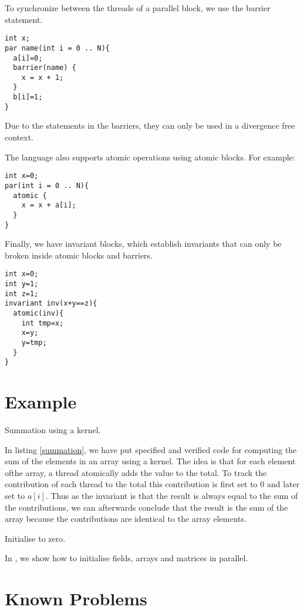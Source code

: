 To synchronize between the threads of a parallel block, we use the barrier statement.
\begin{lstlisting}
int x;
par name(int i = 0 .. N){
  a[i]=0;
  barrier(name) {
    x = x + 1;
  }
  b[i]=1;
}
\end{lstlisting}
Due to the statements in the barriers, they can only be used in
a divergence free context.

The language also supports atomic operations using atomic blocks.
For example:
\begin{lstlisting}
int x=0;
par(int i = 0 .. N){
  atomic {
    x = x + a[i];
  }
}
\end{lstlisting}

Finally, we have invariant blocks, which establish invariants
that can only be broken inside atomic blocks and barriers.
\begin{lstlisting}
int x=0;
int y=1;
int z=1;
invariant inv(x+y==z){
  atomic(inv){
    int tmp=x;
    x=y;
    y=tmp;
  }
}
\end{lstlisting}

\section{Example}

\begin{listing}

\caption{Summation using a kernel.}
\label{summation}
\end{listing}

In listing \ref{summation}, we have put specified and verified code
for computing the sum of the elements in an array using a kernel.
The idea is that for each element ofthe array, a thread atomically adds the
value to the total. To track the contribution of each thread to the total
this contribution is first set to $0$ and later set to $a[i]$. Thus as the invariant
is that the result is always equal to the sum of the contributions,
we can afterwards conclude that the result is the sum of the array
because the contributions are identical to the array elements.

\begin{listing}

\caption{Initialise to zero.}
\label{zero-many}
\end{listing}

In , we show how to initialise fields, arrays and matrices in parallel.

\section{Known Problems}

